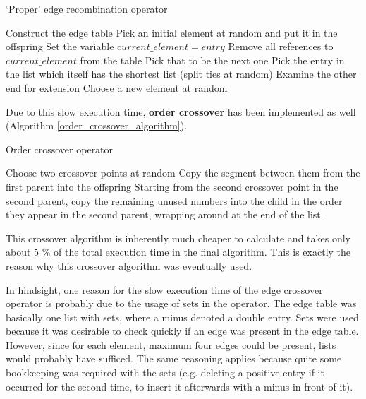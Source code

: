\documentclass[a4paper,10pt]{article}
\begin{document}
\begin{algorithm}
\caption{`Proper' edge recombination operator \cite{eiben_smith}}\label{proper_edge_crossover}
\begin{algorithmic}
\State Construct the edge table
\State Pick an initial element at random and put it in the offspring
\State Set the variable $current\_element = entry$
\State Remove all references to $current\_element$ from the table
\State Pick that to be the next one
\Else
\State Pick the entry in the list which itself has the shortest list (split ties at random)
\EndIf
{}
\State Examine the other end for extension
\Else
\State Choose a new element at random
\EndIf
\EndIf
\EndWhile
\end{algorithmic}
\end{algorithm}

Due to this slow execution time, \textbf{order crossover} \cite{eiben_smith} has been implemented as well (Algorithm \ref{order_crossover_algorithm}).

\begin{algorithm}
\caption{Order crossover operator \cite{eiben_smith}}\label{order_crossover_algorithm}
\begin{algorithmic}
\State Choose two crossover points at random
\State Copy the segment between them from the first parent into the offspring
\State Starting from the second crossover point in the second parent, copy the remaining unused numbers into the child in the order they appear in the second parent, wrapping around at the end of the list.
\end{algorithmic}
\end{algorithm}

This crossover algorithm is inherently much cheaper to calculate and takes only about 5 \% of the total execution time in the final algorithm. This is exactly the reason why this crossover algorithm was eventually used. 

In hindsight, one reason for the slow execution time of the edge crossover operator is probably due to the usage of sets in the operator. The edge table was basically one list with sets, where a minus denoted a double entry. Sets were used because it was desirable to check quickly if an edge was present in the edge table. However, since for each element, maximum four edges could be present, lists would probably have sufficed. The same reasoning applies because quite some bookkeeping was required with the sets (e.g. deleting a positive entry if it occurred for the second time, to insert it afterwards with a minus in front of it). 
\end{document}
